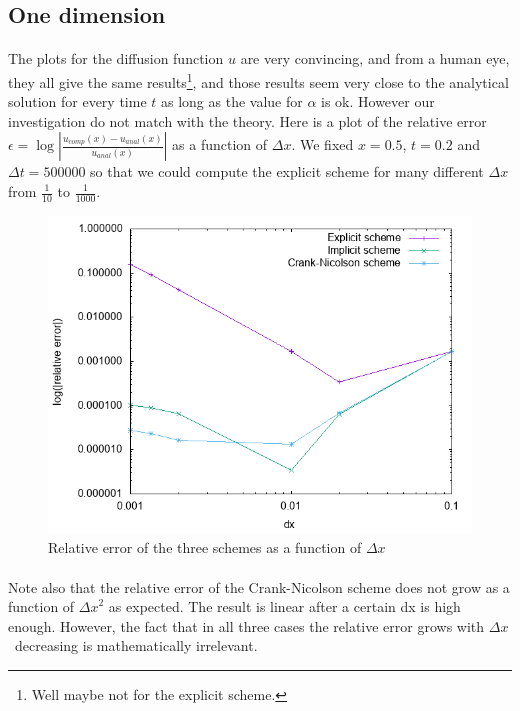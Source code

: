 \documentclass[a4paper, twoside, 11pt]{report}
\theoremstyle{theorem}
\theoremstyle{remark}
\theoremstyle{exemple}
\newcommand{\dx}{$\Delta x$ \ }
\begin{document}
        \subsection{One dimension}

            \paragraph{}The plots for the diffusion function $u$ are very convincing, and from a human eye, they all give the same results\footnote{Well maybe not for the explicit scheme.}, and those results seem very close to the analytical solution for every time $t$ as long as the value for $\alpha$ is ok. However our investigation do not match with the theory. Here is a plot of the relative error $\epsilon=\log{|\frac{{u}_{comp}(x) - {u}_{anal}(x)}{{u}_{anal}(x)}|}$ as a function of $\Delta x$. We fixed $x=0.5$, $t=0.2$ and $\Delta t = 500000$ so that we could compute the explicit scheme for many different $\Delta x$ from $\frac{1}{10}$ to $\frac{1}{1000}$.

            \begin{figure}[h!]
                \begin{center}
                    \includegraphics[scale=0.42]{images/error-dx.png}
                    \caption{Relative error of the three schemes as a function of $\Delta x$}
                \end{center}
            \end{figure}

            \paragraph{}Note also that the relative error of the Crank-Nicolson scheme does not grow as a function of ${\Delta x}^{2}$ as expected. The result is linear after a certain dx is high enough. However, the fact that in all three cases the relative error grows with \dx decreasing is mathematically irrelevant.
\end{document}
